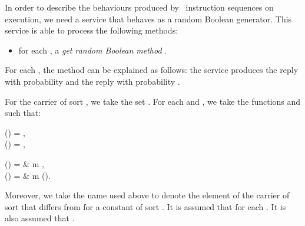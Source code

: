 \documentclass{llncs}
\begin{document}
In order to describe the behaviours produced by \prPGLB\ instruction 
sequences on execution, we need a service that behaves as a random 
Boolean generator.
This service is able to process the following methods:
\begin{itemize}
\item
for each , a \emph{get random Boolean method} 
.
\end{itemize}
For each , the method  can be explained as 
follows: the service produces the reply  with probability  
and the reply  with probability .

For the carrier of sort , we take the set 
.
For each  and , we take the functions 
 and  such that:
\begin{ldispl}
\begin{geqns}
\derive{\get(\pi)}(\Random)        = \Random\;, \\
\prsreply{\get(\pi)}{\pi}(\Random) = \True\;, 
\end{geqns}
\qquad
\begin{gceqns}
(\Random) = \emptyserv &  \; 
m \not\in \set{\get(\pi) \where \pi \in \Prob}\;, \\
(\Random) = \False &  \; 
m \neq \get(\pi)\;.
\end{gceqns}
\end{ldispl}Moreover, we take the name  used above to denote the element of
the carrier of sort  that differs from  for a 
constant of sort .
It is assumed that  for each .
It is also assumed that .
\end{document}
